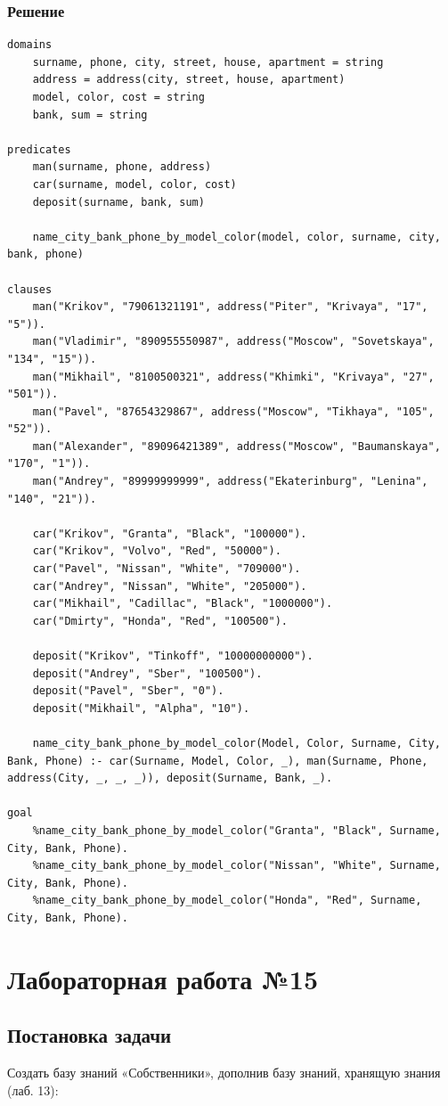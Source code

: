 \documentclass[12pt]{report}
\begin{document}
\subsection*{Решение}
\begin{lstlisting}
domains
	surname, phone, city, street, house, apartment = string
	address = address(city, street, house, apartment)
	model, color, cost = string
	bank, sum = string

predicates
	man(surname, phone, address)
	car(surname, model, color, cost)
	deposit(surname, bank, sum)

	name_city_bank_phone_by_model_color(model, color, surname, city, bank, phone)

clauses
	man("Krikov", "79061321191", address("Piter", "Krivaya", "17", "5")).
	man("Vladimir", "890955550987", address("Moscow", "Sovetskaya", "134", "15")).
	man("Mikhail", "8100500321", address("Khimki", "Krivaya", "27", "501")).
	man("Pavel", "87654329867", address("Moscow", "Tikhaya", "105", "52")).
	man("Alexander", "89096421389", address("Moscow", "Baumanskaya", "170", "1")).
	man("Andrey", "89999999999", address("Ekaterinburg", "Lenina", "140", "21")).

	car("Krikov", "Granta", "Black", "100000").
	car("Krikov", "Volvo", "Red", "50000").
	car("Pavel", "Nissan", "White", "709000").
	car("Andrey", "Nissan", "White", "205000").
	car("Mikhail", "Cadillac", "Black", "1000000").
	car("Dmirty", "Honda", "Red", "100500").

	deposit("Krikov", "Tinkoff", "10000000000").
	deposit("Andrey", "Sber", "100500").
	deposit("Pavel", "Sber", "0").
	deposit("Mikhail", "Alpha", "10").

	name_city_bank_phone_by_model_color(Model, Color, Surname, City, Bank, Phone) :- car(Surname, Model, Color, _), man(Surname, Phone, address(City, _, _, _)), deposit(Surname, Bank, _).

goal
	%name_city_bank_phone_by_model_color("Granta", "Black", Surname, City, Bank, Phone).
	%name_city_bank_phone_by_model_color("Nissan", "White", Surname, City, Bank, Phone).
	%name_city_bank_phone_by_model_color("Honda", "Red", Surname, City, Bank, Phone).
\end{lstlisting}

\chapter*{Лабораторная работа №15}
\section*{Постановка задачи}
Создать базу знаний «Собственники», дополнив базу знаний, хранящую знания (лаб. 13):
\end{document}
